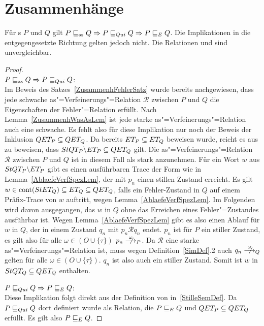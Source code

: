 \section{Zusammenhänge}

\begin{Satz}
  \label{ZusammenhStilleSatz}
  Für \MEIO{}s $P$ und $Q$ gilt $P \sqsubseteq _{\mathrm{as}} Q \Rightarrow P  \sqsubseteq  _{Qui} Q \Rightarrow
  P  \sqsubseteq  _E Q$. Die Implikationen in die entgegengesetzte Richtung gelten jedoch
  nicht. Die Relationen \wasRel{} und \QRel{} sind unvergleichbar.
\end{Satz}
\begin{proof}\mbox{}\\
  $P \sqsubseteq _{\mathrm{as}} Q \Rightarrow P  \sqsubseteq  _{Qui} Q$:\\
  Im Beweis des Satzes~\ref{ZusammenhFehlerSatz} wurde bereits nachgewiesen,
  dass jede schwache as"=Verfeinerungs"=Relation $\mathcal{R}$ zwischen $P$ und
  $Q$ die Eigenschaften der Fehler"=Relation \ERel{} erfüllt. Nach
  Lemma~\ref{ZusammenhWasAsLem} ist jede starke as"=Verfeinerungs"=Relation
  auch eine schwache. Es fehlt also für diese Implikation nur noch der Beweis
  der Inklusion $QET _P \subseteq QET _Q$. Da bereits $ET _P\subseteq ET
  _Q$ beweisen wurde, reicht es aus zu beweisen, dass $StQT _P \backslash ET
  _P\subseteq QET _Q$ gilt. Die as"=Verfeinerungs"=Relation $\mathcal{R}$
  zwischen $P$ und $Q$ ist in diesem Fall als stark anzunehmen. Für ein Wort
  $w$ aus $StQT _P \backslash ET _P$ gibt es einen ausführbaren Trace der
  Form wie in Lemma~\ref{AblaefeVerfSpezLem}, der mit $p_n$ einen stillen
  Zustand erreicht. Es gilt $w\in\mathrm{cont} (StET _Q) \subseteq ET _Q\subseteq QET
  _Q$, falls ein Fehler-Zustand in $Q$ auf einem Präfix-Trace von $w$ auftritt,
  wegen Lemma~\ref{AblaefeVerfSpezLem}. Im Folgenden wird davon ausgegangen,
  das $w$ in $Q$ ohne das Erreichen eines Fehler"=Zustandes ausführbar ist.
  Wegen Lemma~\ref{AblaefeVerfSpezLem} gibt es also einen Ablauf für $w$ in
  $Q$, der in einem Zustand $q_n$ mit $p_n \mathcal{R} q_n$ endet. $p_n$ ist
  für $P$ ein stiller Zustand, es gilt also für alle $\omega \in (O\cup
  \{\tau\})$ $p_n \nmust[\omega]_P$. Da $\mathcal{R}$ eine starke
  as"=Verfeinerungs"=Relation ist, muss wegen Definition~\ref{SimDef}.2 auch
  $q_n \nmust[\omega]_Q$ gelten für alle $\omega \in (O\cup \{\tau\})$. $q_n$
  ist also auch ein stiller Zustand. Somit ist $w$ in $StQT _Q\subseteq QET
  _Q$ enthalten.

  $P  \sqsubseteq  _{Qui} Q \Rightarrow P  \sqsubseteq  _E Q$:\\
  Diese Implikation folgt direkt aus der Definition von \QRel{}
  in~\ref{StilleSemDef}. Da $P  \sqsubseteq  _{Qui} Q$ dort definiert wurde als Relation, die
  $P  \sqsubseteq  _E Q$ und $QET _P \subseteq QET _Q$ erfüllt. Es gilt also $P  \sqsubseteq  _E Q$.


\end{proof}
